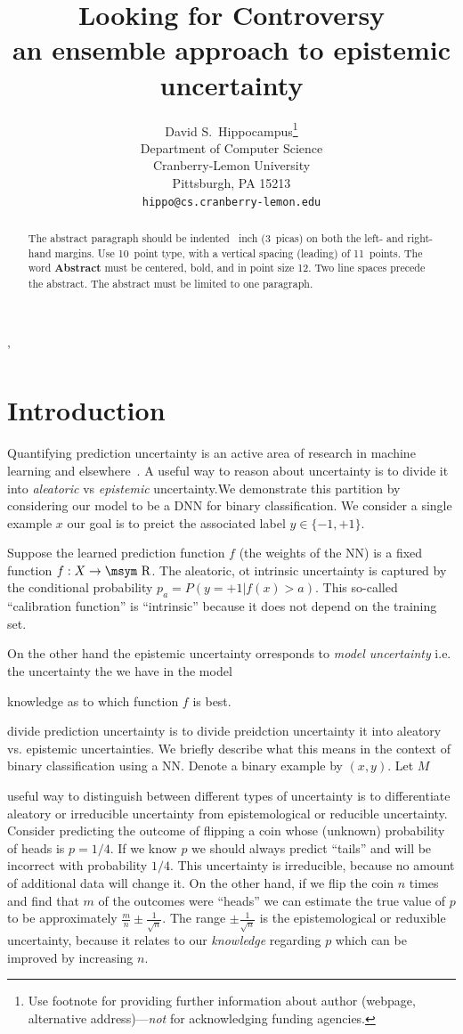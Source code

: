 \documentclass{article}
\title{Looking for Controversy\\ {\large an ensemble approach to epistemic uncertainty} }
\author{%
  David S.~Hippocampus\thanks{Use footnote for providing further information
    about author (webpage, alternative address)---\emph{not} for acknowledging
    funding agencies.} \\
  Department of Computer Science\\
  Cranberry-Lemon University\\
  Pittsburgh, PA 15213 \\
  \texttt{hippo@cs.cranberry-lemon.edu} \\
}
\newcommand{\reals}{\mbox{\msym R}}
\begin{document}
\nolinenumbers'

\maketitle


\begin{abstract}
  The abstract paragraph should be indented ~inch (3~picas) on
  both the left- and right-hand margins. Use 10~point type, with a vertical
  spacing (leading) of 11~points.  The word \textbf{Abstract} must be centered,
  bold, and in point size 12. Two line spaces precede the abstract. The abstract
  must be limited to one paragraph.
\end{abstract}


\section{Introduction}
Quantifying prediction uncertainty is an active area of research in
machine learning and
elsewhere~\cite{breiman1993fitting,li2008knows,hora1996aleatory,mc-dropout,der2009aleatory,hullermeier2019aleatoric}. A
useful way to reason about uncertainty is to divide it into {\em
  aleatoric} vs {\em epistemic} uncertainty.We demonstrate this
partition by considering our model to be a DNN for binary
classification.  We consider a single example $x$ our goal is to
preict the associated label $y \in \{-1,+1\}$.


Suppose the learned
prediction function $f$ (the weights of the NN) is a fixed function
$f: X \to \reals$. The aleatoric, ot intrinsic uncertainty is captured
by the conditional probability $p_a=P(y=+1|f(x)>a)$. This so-called
``calibration function'' is ``intrinsic'' because it does not depend
on the training set.

On the other hand the epistemic uncertainty orresponds to {\em model uncertainty} i.e. the uncertainty the we have in the model



knowledge as to which function $f$ is best. 


divide prediction uncertainty is to divide preidction uncertainty it into
aleatory vs. epistemic uncertainties. We briefly describe what this
means in the context of binary classification using a NN. Denote a
binary example by $(x,y)$. Let $M$ 





useful way to distinguish between different types of uncertainty is to
differentiate aleatory or irreducible uncertainty from epistemological
or reducible uncertainty. Consider predicting the outcome of flipping
a coin whose (unknown) probability of heads is $p=1/4$. If we know $p$
we should always predict ``tails'' and will be incorrect with
probability $1/4$. This uncertainty is irreducible, because no amount
of additional data will change it. On the other hand, if we flip the
coin $n$ times and find that $m$ of the outcomes were ``heads'' we can
estimate the true value of $p$ to be approximately
$\frac{m}{n} \pm \frac{1}{\sqrt{n}}$. The range
$\pm \frac{1}{\sqrt{n}}$ is the epistemological or reduxible
uncertainty, because it relates to our {\em knowledge} regarding $p$
which can be improved by increasing $n$.
\end{document}
